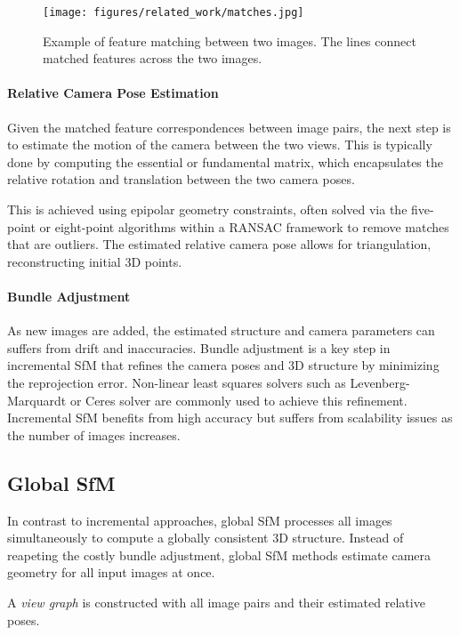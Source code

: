 \begin{figure}[h]
    \centering
    \texttt{[image: figures/related\_work/matches.jpg]}
    \caption{Example of feature matching between two images. The lines connect matched features across the two images.}
    \label{fig:incremental_sfm}
\end{figure}


\paragraph{Relative Camera Pose Estimation}
Given the matched feature correspondences between image pairs, the next step is to estimate the motion of the camera between the two views.
This is typically done by computing the essential or fundamental matrix, which encapsulates the relative rotation and translation between the two camera poses.

This is achieved using epipolar geometry constraints, often solved via the five-point or eight-point algorithms within a RANSAC \cite{fischler1981random} framework to remove matches that are outliers.
The estimated relative camera pose allows for triangulation, reconstructing initial 3D points.

\paragraph{Bundle Adjustment}
As new images are added, the estimated structure and camera parameters can suffers from drift and inaccuracies.
Bundle adjustment is a key step in incremental SfM that refines the camera poses and 3D structure by minimizing the reprojection error.
Non-linear least squares solvers such as Levenberg-Marquardt or Ceres solver are commonly used to achieve this refinement. 
Incremental SfM benefits from high accuracy but suffers from scalability issues as the number of images increases.

\subsection{Global SfM}
In contrast to incremental approaches, global SfM processes all images simultaneously to compute a globally consistent 3D structure.
Instead of reapeting the costly bundle adjustment, global SfM methods estimate camera geometry for all input images at once.

A \emph{view graph} is constructed with all image pairs and their estimated relative poses.

